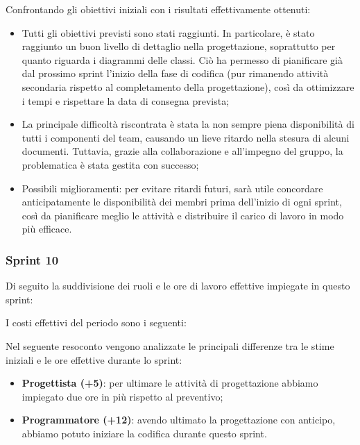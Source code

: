 

Confrontando gli obiettivi iniziali con i risultati effettivamente ottenuti:
\begin{itemize}
\item Tutti gli obiettivi previsti sono stati raggiunti. In particolare, è stato raggiunto un buon livello di dettaglio nella progettazione, soprattutto per quanto riguarda i diagrammi delle classi. Ciò ha permesso di pianificare già dal prossimo sprint l’inizio della fase di codifica (pur rimanendo attività secondaria rispetto al completamento della progettazione), così da ottimizzare i tempi e rispettare la data di consegna prevista;
\item La principale difficoltà riscontrata è stata la non sempre piena disponibilità di tutti i componenti del team, causando un lieve ritardo nella stesura di alcuni documenti. Tuttavia, grazie alla collaborazione e all’impegno del gruppo, la problematica è stata gestita con successo;
\item Possibili miglioramenti: per evitare ritardi futuri, sarà utile concordare anticipatamente le disponibilità dei membri prima dell'inizio di ogni sprint, così da pianificare meglio le attività e distribuire il carico di lavoro in modo più efficace.
\end{itemize}

\subsubsection{Sprint 10}
Di seguito la suddivisione dei ruoli e le ore di lavoro effettive impiegate in questo sprint:



I costi effettivi del periodo sono i seguenti:



Nel seguente resoconto vengono analizzate le principali differenze tra le stime iniziali e le ore effettive durante lo sprint:
\begin{itemize}
    \item \textbf{Progettista (+5)}: per ultimare le attività di progettazione abbiamo impiegato due ore in più rispetto al preventivo;
    \item \textbf{Programmatore (+12)}: avendo ultimato la progettazione con anticipo, abbiamo potuto iniziare la codifica durante questo sprint.
\end{itemize}

